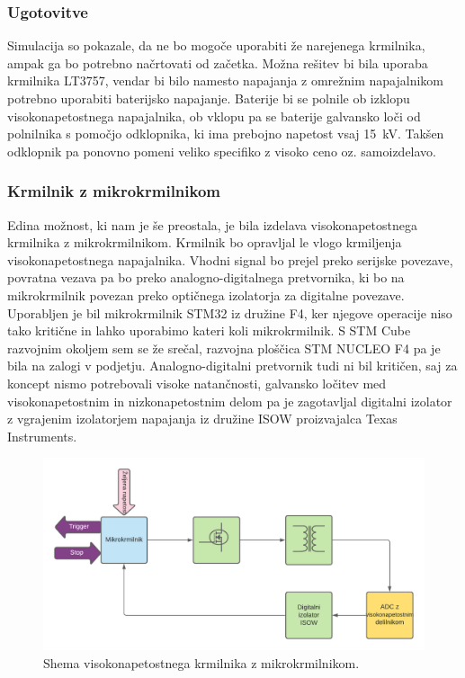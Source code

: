 \documentclass[a4paper,twoside,openright,12pt,Slovene]{book}
\begin{document}
    \subsubsection{Ugotovitve} \label{Ugotovitve glede komercialnih krmilnkov}
Simulacija so pokazale, da ne bo mogoče uporabiti že narejenega krmilnika, ampak ga bo potrebno načrtovati od začetka. Možna rešitev bi bila uporaba krmilnika LT3757, vendar bi bilo namesto napajanja z omrežnim napajalnikom potrebno uporabiti baterijsko napajanje. Baterije bi se polnile ob izklopu visokonapetostnega napajalnika, ob vklopu pa se baterije galvansko loči od polnilnika s pomočjo odklopnika,  ki ima prebojno napetost vsaj \SI{15}{\kilo\volt}. Takšen odklopnik pa ponovno pomeni veliko specifiko z visoko ceno oz. samoizdelavo. 

	\subsubsection{Krmilnik z mikrokrmilnikom} \label{KrmilnikzUc}
Edina možnost, ki nam je še preostala, je bila izdelava visokonapetostnega krmilnika z mikrokrmilnikom. Krmilnik bo opravljal le vlogo krmiljenja visokonapetostnega napajalnika. Vhodni signal bo prejel preko serijske povezave, povratna vezava pa bo preko analogno-digitalnega pretvornika, ki bo na mikrokrmilnik povezan preko optičnega izolatorja za digitalne povezave. Uporabljen je bil mikrokrmilnik STM32 iz družine F4, ker njegove operacije niso tako kritične in lahko uporabimo kateri koli mikrokrmilnik. S STM Cube razvojnim okoljem sem se že srečal, razvojna ploščica STM NUCLEO F4 pa je bila na zalogi v podjetju. Analogno-digitalni pretvornik tudi ni bil kritičen, saj za koncept nismo potrebovali visoke natančnosti, galvansko ločitev med visokonapetostnim in nizkonapetostnim delom pa je zagotavljal digitalni izolator z vgrajenim izolatorjem napajanja iz družine ISOW proizvajalca Texas Instruments. 

	\begin{figure}[H]
    \centering
    \includegraphics[width=1\columnwidth]{Sheme/KrmilnikzuCElShema.pdf}
    \caption{\label{KrmilnikzuCElShema} Shema visokonapetostnega krmilnika z mikrokrmilnikom.}
	\end{figure}
\end{document}
